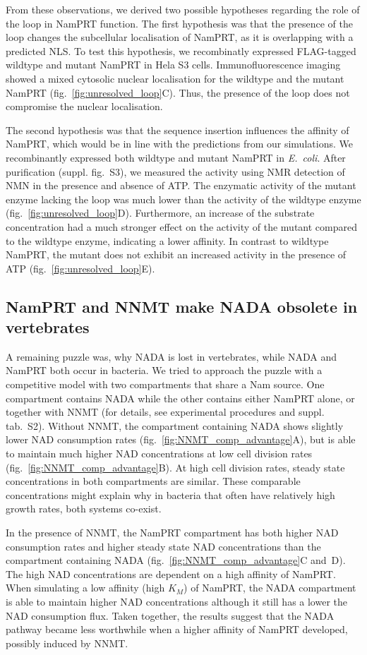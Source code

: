 From these observations, we derived two possible hypotheses regarding the role of the loop in NamPRT function. The first hypothesis was that the presence of the loop changes the subcellular localisation of NamPRT, as it is overlapping with a predicted NLS. To test this hypothesis, we recombinatly expressed FLAG-tagged  wildtype and mutant NamPRT in Hela S3 cells. Immunofluorescence imaging showed a mixed cytosolic nuclear localisation for the wildtype and the mutant NamPRT (fig.~\ref{fig:unresolved_loop}C). Thus, the presence of the loop does not compromise the nuclear localisation.

The second hypothesis was that the sequence insertion influences the affinity of NamPRT, which would be in line with the predictions from our simulations. We recombinantly expressed both wildtype and mutant NamPRT in \textit{E.~coli}. After purification (suppl. fig.~S3), we measured the activity using NMR detection of NMN in the presence and absence of ATP. The enzymatic activity of the mutant enzyme lacking the loop was much lower than the activity of the wildtype enzyme (fig.~\ref{fig:unresolved_loop}D). Furthermore, an increase of the substrate concentration had a much stronger effect on the activity of the mutant compared to the wildtype enzyme, indicating a lower affinity. In contrast to wildtype NamPRT, the mutant does not exhibit an increased activity in the presence of ATP (fig.~\ref{fig:unresolved_loop}E).


\subsection{NamPRT and NNMT make NADA obsolete in vertebrates}

A remaining puzzle was, why NADA is lost in vertebrates, while NADA and NamPRT both occur in bacteria. We tried to approach the puzzle with a competitive model with two compartments that share a Nam source. One compartment contains NADA while the other contains either NamPRT alone, or together with NNMT (for details, see experimental procedures and suppl. tab.~S2). Without NNMT, the compartment containing NADA shows slightly lower NAD consumption rates (fig.~\ref{fig:NNMT_comp_advantage}A), but is able to maintain much higher NAD concentrations at low cell division rates (fig.~\ref{fig:NNMT_comp_advantage}B). At high cell division rates, steady state concentrations in both compartments are similar. These comparable concentrations might explain why in bacteria that often have relatively high growth rates, both systems co-exist.

In the presence of NNMT, the NamPRT compartment has both higher NAD consumption rates and higher steady state NAD concentrations than the compartment containing NADA (fig.~\ref{fig:NNMT_comp_advantage}C and~D). The high NAD concentrations are dependent on a high affinity of NamPRT. When simulating a low affinity (high $K_{M}$) of NamPRT, the NADA compartment is able to maintain higher NAD concentrations although it still has a lower the NAD consumption flux. Taken together, the results suggest that the NADA pathway became less worthwhile when a higher affinity of NamPRT developed, possibly induced by NNMT.
